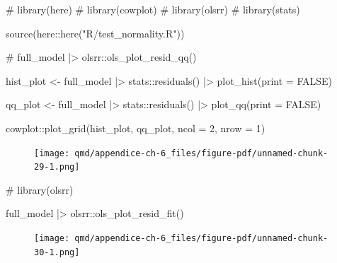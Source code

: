 \documentclass[
  12pt,
  a4paper,
  oneside]{tesesusp}
\newenvironment{Shaded}{\begin{snugshade}}{\end{snugshade}}
\newcommand{\AttributeTok}[1]{\textcolor[rgb]{0.40,0.45,0.13}{#1}}
\newcommand{\CommentTok}[1]{\textcolor[rgb]{0.37,0.37,0.37}{#1}}
\newcommand{\ConstantTok}[1]{\textcolor[rgb]{0.56,0.35,0.01}{#1}}
\newcommand{\DecValTok}[1]{\textcolor[rgb]{0.68,0.00,0.00}{#1}}
\newcommand{\FunctionTok}[1]{\textcolor[rgb]{0.28,0.35,0.67}{#1}}
\newcommand{\NormalTok}[1]{\textcolor[rgb]{0.00,0.23,0.31}{#1}}
\newcommand{\OtherTok}[1]{\textcolor[rgb]{0.00,0.23,0.31}{#1}}
\newcommand{\SpecialCharTok}[1]{\textcolor[rgb]{0.37,0.37,0.37}{#1}}
\newcommand{\StringTok}[1]{\textcolor[rgb]{0.13,0.47,0.30}{#1}}
\begin{document}
\begin{Shaded}
\begin{Highlighting}[numbers=left,,]
\CommentTok{\# library(here)}
\CommentTok{\# library(cowplot)}
\CommentTok{\# library(olsrr)}
\CommentTok{\# library(stats)}

\FunctionTok{source}\NormalTok{(here}\SpecialCharTok{::}\FunctionTok{here}\NormalTok{(}\StringTok{"R/test\_normality.R"}\NormalTok{))}

\CommentTok{\# full\_model |\textgreater{} olsrr::ols\_plot\_resid\_qq()}

\NormalTok{hist\_plot }\OtherTok{\textless{}{-}}\NormalTok{ full\_model }\SpecialCharTok{|\textgreater{}}
\NormalTok{  stats}\SpecialCharTok{::}\FunctionTok{residuals}\NormalTok{() }\SpecialCharTok{|\textgreater{}}
  \FunctionTok{plot\_hist}\NormalTok{(}\AttributeTok{print =} \ConstantTok{FALSE}\NormalTok{)}

\NormalTok{qq\_plot }\OtherTok{\textless{}{-}}\NormalTok{ full\_model }\SpecialCharTok{|\textgreater{}} 
\NormalTok{  stats}\SpecialCharTok{::}\FunctionTok{residuals}\NormalTok{() }\SpecialCharTok{|\textgreater{}}
  \FunctionTok{plot\_qq}\NormalTok{(}\AttributeTok{print =} \ConstantTok{FALSE}\NormalTok{)}

\NormalTok{cowplot}\SpecialCharTok{::}\FunctionTok{plot\_grid}\NormalTok{(hist\_plot, qq\_plot, }\AttributeTok{ncol =} \DecValTok{2}\NormalTok{, }\AttributeTok{nrow =} \DecValTok{1}\NormalTok{)}
\end{Highlighting}
\end{Shaded}

\begin{figure}[H]

{\centering \texttt{[image: qmd/appendice-ch-6\_files/figure-pdf/unnamed-chunk-29-1.png]}

}

\end{figure}

\begin{Shaded}
\begin{Highlighting}[numbers=left,,]
\CommentTok{\# library(olsrr)}

\NormalTok{full\_model }\SpecialCharTok{|\textgreater{}}\NormalTok{ olsrr}\SpecialCharTok{::}\FunctionTok{ols\_plot\_resid\_fit}\NormalTok{()}
\end{Highlighting}
\end{Shaded}

\begin{figure}[H]

{\centering \texttt{[image: qmd/appendice-ch-6\_files/figure-pdf/unnamed-chunk-30-1.png]}

}

\end{figure}
\end{document}
